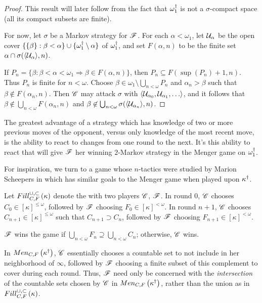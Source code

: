 \begin{proof}
  This result will later follow from the fact that
  $\omega^\dagger_1$ is not a $\sigma$-compact space (all its compact subsets
  are finite).

  For now, let $\sigma$ be a Markov strategy for $\mathscr{F}$. For
  each $\alpha<\omega_1$, let $\mathcal{U}_\alpha$ be the open cover
  $\{\{\beta\}:\beta<\alpha\}\cup\{\omega_1^\dagger\setminus\alpha\}$ of
  $\omega_1^\dagger$, and set $F(\alpha,n)$ to be the finite set
  $\alpha\cap\sigma(\langle\mathcal{U}_\alpha\rangle,n)$.

  If
    $
      P_n =
      \{\beta: \beta < \alpha < \omega_1 \Rightarrow \beta \in F(\alpha,n)\}
    $,
  then $P_n\subseteq F(\sup(P_n)+1,n)$. Thus $P_n$ is finite for $n<\omega$.
  Choose $\beta\in\omega_1\setminus \bigcup_{n<\omega}P_n$
  and $\alpha_n>\beta$ such that $\beta\not\in F(\alpha_n,n)$.
  Then $\mathscr{C}$ may attack
  $\sigma$ with $\<\mc U_{\alpha_0}, \mc U_{\alpha_1},\dots\>$,
  and it follows that
  $\beta\not\in \bigcup_{n<\omega}F(\alpha_n,n)$ and
  $\beta\not\in \bigcup_{n<\omega}\sigma(\langle\mathcal{U}_{\alpha_n}\rangle,n)$.
\end{proof}

The greatest advantage of a strategy which has knowledge of two or more previous
moves of the opponent, versus only knowledge of the most recent move, is the
ability to react to changes from one round to the next. It's this ability to
react that will give $\mathscr{F}$ her winning $2$-Markov strategy in the Menger
game on $\omega^\dagger_1$.

For inspiration, we turn to a game whose $n$-tactics were studied by Marion
Scheepers in \cite{MR1129143} which has similar goals to the Menger game when
played upon $\kappa^\dagger$.

\begin{game}
  Let $Fill^{\cup,\subset}_{C,F}\left({\kappa}\right)$ denote the 
  with two players $\mathscr{C}$, $\mathscr{F}$. In round $0$, $\mathscr{C}$ chooses
  $C_0\in[\kappa]^{\leq\omega}$, followed by $\mathscr{F}$ choosing
  $F_0\in[\kappa]^{<\omega}$. In round $n+1$, $\mathscr{C}$ chooses
  $C_{n+1}\in[\kappa]^{\leq\omega}$ such that $C_{n+1}\supset C_n$, followed
  by $\mathscr{F}$ choosing $F_{n+1}\in[\kappa]^{<\omega}$.

  $\mathscr{F}$ wins the game if
  $\bigcup_{n<\omega} F_n\supseteq\bigcup_{n<\omega} C_n$; otherwise, $\mathscr{C}$
  wins.
\end{game}

In $Men_{C,F}\left({\kappa^\dagger}\right)$, $\mathscr{C}$ essentially chooses a countable set
to not include in her neighborhood of $\infty$, followed by $\mathscr{F}$ choosing
a finite subset of this complement to cover during each round. Thus,
$\mathscr{F}$ need only be concerned with the \textit{intersection} of the
countable sets chosen by $\mathscr{C}$ in $Men_{C,F}\left({\kappa^\dagger}\right)$, rather
than the union as in $Fill^{\cup,\subset}_{C,F}\left({\kappa}\right)$.

